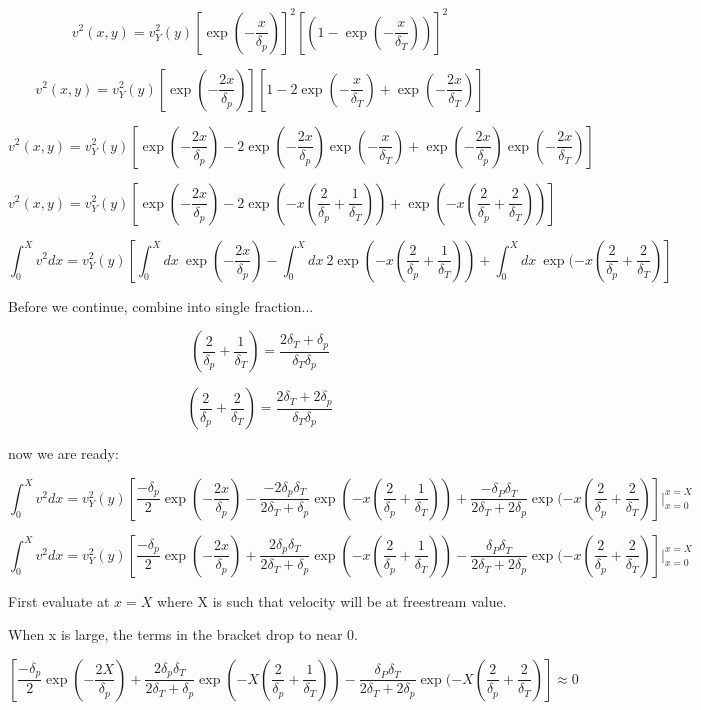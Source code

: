 \documentclass[11pt]{article}
\begin{document}
$$v^2 (x,y) = v_Y^2 (y) [\exp (-\frac{x}{\delta_p})]^2 [(1- \exp (-\frac{x}{\delta_T}))]^2$$

$$v^2 (x,y) = v_Y^2 (y) [\exp (-\frac{2x}{\delta_p})] [1 - 2 \exp (-\frac{x}{\delta_T}) + \exp (-\frac{2x}{\delta_T})]$$

$$v^2 (x,y) = v_Y^2 (y)  [\exp (-\frac{2x}{\delta_p}) - 2 \exp (-\frac{2x}{\delta_p}) \exp (-\frac{x}{\delta_T}) + \exp (-\frac{2x}{\delta_p}) \exp (-\frac{2x}{\delta_T})]$$

$$v^2 (x,y) = v_Y^2 (y)  [\exp (-\frac{2x}{\delta_p}) - 2 \exp (-x(\frac{2}{\delta_p} + \frac{1}{\delta_T}))  + \exp (-x(\frac{2}{\delta_p}+\frac{2}{\delta_T})) ]$$

$$\int_0^X v^2 dx = v_Y^2 (y) [ \int_0^X dx \  \exp (-\frac{2x}{\delta_p}) - \int_0^X dx \  2 \exp (-x(\frac{2}{\delta_p} + \frac{1}{\delta_T}))  + \int_0^X dx \  \exp (-x(\frac{2}{\delta_p}+\frac{2}{\delta_T}) ] $$

Before we continue, combine into single fraction...

$$(\frac{2}{\delta_p} + \frac{1}{\delta_T}) = \frac{2\delta_T + \delta_p}{\delta_T \delta_p}$$

$$(\frac{2}{\delta_p} + \frac{2}{\delta_T}) = \frac{2\delta_T +2 \delta_p}{\delta_T \delta_p}$$

now we are ready:


$$\int_0^X v^2 dx = v_Y^2 (y) [  \frac{-\delta_p}{2} \exp (-\frac{2x}{\delta_p}) - \frac{-2\delta_p \delta_T}{2\delta_T + \delta_p} \exp (-x(\frac{2}{\delta_p} + \frac{1}{\delta_T}))  + \frac{-\delta_P \delta_T}{2 \delta_T + 2\delta_p}  \exp (-x(\frac{2}{\delta_p}+\frac{2}{\delta_T}) ]|_{x=0}^{x=X} $$

$$\int_0^X v^2 dx = v_Y^2 (y) [  \frac{-\delta_p}{2} \exp (-\frac{2x}{\delta_p}) + \frac{2\delta_p \delta_T}{2\delta_T + \delta_p} \exp (-x(\frac{2}{\delta_p} + \frac{1}{\delta_T}))  - \frac{\delta_P \delta_T}{2 \delta_T + 2\delta_p}  \exp (-x(\frac{2}{\delta_p}+\frac{2}{\delta_T}) ]|_{x=0}^{x=X} $$


First evaluate at $x=X$ where X is such that velocity will be at freestream value.

When x is large, the terms in the bracket drop to near 0.

$$[  \frac{-\delta_p}{2} \exp (-\frac{2X}{\delta_p}) + \frac{2\delta_p \delta_T}{2\delta_T + \delta_p} \exp (-X(\frac{2}{\delta_p} + \frac{1}{\delta_T}))  - \frac{\delta_P \delta_T}{2 \delta_T + 2\delta_p}  \exp (-X(\frac{2}{\delta_p}+\frac{2}{\delta_T}) ] \approx 0$$
\end{document}
